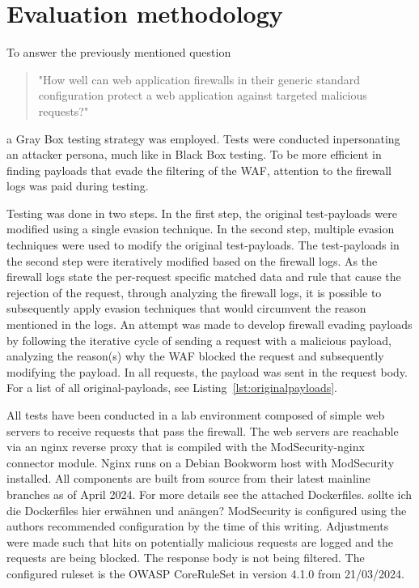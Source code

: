 \section{Evaluation methodology}
\label{sec:evaluation}
To answer the previously mentioned question
\begin{quote} "How well can web application firewalls in their generic standard configuration protect a web application against targeted malicious requests?"
\end{quote}
a Gray Box testing strategy was employed. Tests were conducted inpersonating an attacker persona, much like in Black Box testing.
To be more efficient in finding payloads that evade the filtering of the WAF, attention to the firewall logs was paid during testing.

Testing was done in two steps. In the first step, the original test-payloads were modified using a single evasion technique.
In the second step, multiple evasion techniques were used to modify the original test-payloads.
The test-payloads in the second step were iteratively modified based on the firewall logs.
As the firewall logs state the per-request specific matched data and rule that cause the rejection of the request, through analyzing the firewall logs, it is possible to subsequently apply evasion techniques that would circumvent the reason mentioned in the logs.
An attempt was made to develop firewall evading payloads by following the iterative cycle of sending a request with a malicious payload, analyzing the reason(s) why the WAF blocked the request and subsequently modifying the payload. In all requests, the payload was sent in the request body. For a list of all original-payloads, see Listing~\ref{lst:originalpayloads}.

All tests have been conducted in a lab environment composed of simple web servers to receive requests that pass the firewall.
The web servers are reachable via an nginx reverse proxy that is compiled with the ModSecurity-nginx connector module. Nginx runs on a Debian Bookworm host with ModSecurity installed.
All components are built from source from their latest mainline branches as of April 2024.
For more details see the attached Dockerfiles.
	{\color{red} sollte ich die Dockerfiles hier erwähnen und anängen?}
ModSecurity is configured using the authors recommended configuration by the time of this writing. \cite{modsec/recconf}
Adjustments were made such that hits on potentially malicious requests are logged and the requests are being blocked. The response body is not being filtered.
The configured ruleset is the OWASP CoreRuleSet in version 4.1.0 from 21/03/2024. \cite{crs/410dl}
